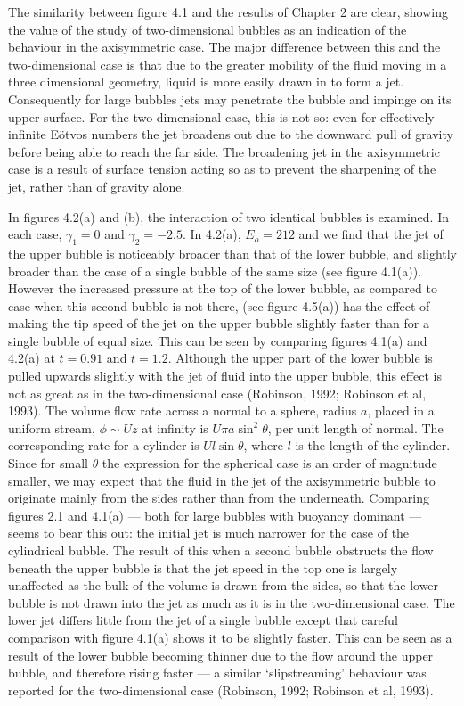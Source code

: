 The similarity between figure 4.1 and the results of 
Chapter 2 are clear, showing the value of the study
of two-dimensional bubbles as an indication of the
behaviour in the axisymmetric case.
The major difference between this and the two-dimensional case
is that due to the greater mobility of the fluid moving in a 
three dimensional geometry, liquid is more easily drawn in to form a 
jet. Consequently for large bubbles jets may penetrate the
bubble and impinge on its upper surface. For the two-dimensional
case, this is not so: even for effectively infinite E\"otvos numbers
the jet broadens out due to the downward pull of gravity before 
being able to reach the far side. The broadening jet in the axisymmetric
case is a result of surface tension acting so as to prevent 
the sharpening of the jet, rather than of gravity alone.

In figures 4.2(a) and (b),
the interaction of two identical bubbles is examined. 
In each case, $\gamma_1=0$ and $\gamma_2=-2.5$.
In 4.2(a), $E_o=212$ and we find that the jet of the upper bubble
is noticeably broader than that of the lower bubble, and 
slightly broader than the case of 
a single bubble of the same size (see figure 4.1(a)). 
However the increased pressure at the
top of the lower bubble, as compared to case when this second  
bubble is not there, (see figure 4.5(a))
has the effect of making the tip speed of 
the jet on the upper bubble slightly faster than for a single bubble of 
equal size. This can be seen by comparing figures 4.1(a) and 4.2(a)
at $t=0.91$ and $t=1.2$.
Although the upper part of the lower bubble
is pulled upwards slightly with the jet of fluid into the upper bubble,  
this effect is not as great as in 
the two-dimensional case (Robinson, 1992; Robinson et 
al, 1993). The volume flow rate across a normal to a
sphere, radius $a$, placed in a uniform stream, $\phi\sim Uz$ at infinity
is $U\pi a\sin^2\theta$, per unit length of normal.
The corresponding rate for a cylinder is $Ul\sin\theta$,
where $l$ is the length of the cylinder. 
Since for small $\theta$ the expression for the spherical case
is an order of magnitude smaller, we may expect that 
the fluid in the jet of the axisymmetric bubble to originate mainly
from the sides rather than from the underneath. Comparing
figures 2.1 and 4.1(a) --- both for large bubbles with buoyancy 
dominant --- seems to bear this out:
the initial jet is much narrower for the case of the cylindrical bubble.
The result of this when a second bubble obstructs the flow 
beneath the upper bubble is that the jet speed in the top one
is largely unaffected as the bulk of the volume is drawn from
the sides, so that the lower bubble is not drawn into the jet
as much as it is in the two-dimensional case.
The lower jet differs little from the jet of a single bubble except 
that careful comparison with figure 4.1(a) shows it to be
slightly faster. This can be seen as a result
of the lower bubble becoming thinner due to the flow around the upper
bubble, and therefore rising faster ---
a similar `slipstreaming' behaviour was reported for the 
two-dimensional case (Robinson, 1992; Robinson et al, 1993).

